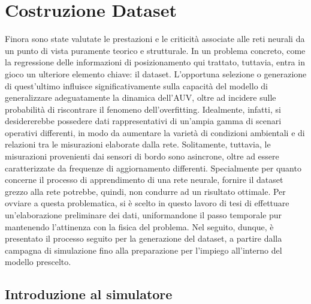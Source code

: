 
\chapter{Costruzione Dataset}






Finora sono state valutate le prestazioni e le criticità associate alle reti neurali da un punto di vista puramente teorico e strutturale. In un problema concreto, come la regressione delle informazioni di posizionamento qui trattato, tuttavia, entra in gioco un ulteriore elemento chiave: il dataset. L'opportuna selezione o generazione di quest'ultimo influisce significativamente sulla capacità del modello di generalizzare adeguatamente la dinamica dell'AUV, oltre ad incidere sulle probabilità di riscontrare il fenomeno dell'overfitting. Idealmente, infatti, si desidererebbe possedere dati rappresentativi di un'ampia gamma di scenari operativi differenti, in modo da aumentare la varietà di condizioni ambientali e di relazioni tra le misurazioni elaborate dalla rete. Solitamente, tuttavia, le misurazioni provenienti dai sensori di bordo sono asincrone, oltre ad essere caratterizzate da frequenze di aggiornamento differenti. Specialmente per quanto concerne il processo di apprendimento di una rete neurale, fornire il dataset grezzo alla rete potrebbe, quindi, non condurre ad un risultato ottimale. Per ovviare a questa problematica, si è scelto in questo lavoro di tesi di effettuare un'elaborazione preliminare dei dati, uniformandone il passo temporale pur mantenendo l'attinenza con la fisica del problema. Nel seguito, dunque, è presentato il processo seguito per la generazione del dataset, a partire dalla campagna di simulazione fino alla preparazione per l'impiego all'interno del modello prescelto.
 

\section{Introduzione al simulatore}

